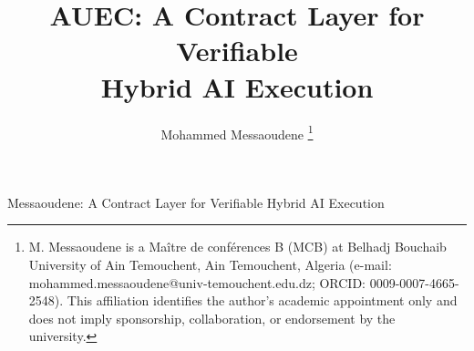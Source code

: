 \title{AUEC: A Contract Layer for Verifiable\\Hybrid AI Execution}

\author{Mohammed Messaoudene%
\thanks{M. Messaoudene is a Maître de conférences B (MCB) at Belhadj Bouchaib University of Ain Temouchent, Ain Temouchent, Algeria (e-mail: mohammed.messaoudene@univ-temouchent.edu.dz; ORCID: 0009-0007-4665-2548). This affiliation identifies the author's academic appointment only and does not imply sponsorship, collaboration, or endorsement by the university.}}

%
{Messaoudene: A Contract Layer for Verifiable Hybrid AI Execution}


\newcommand{\AUECAbstract}{%
AI agents increasingly bridge remote models and local resources. Protocols such as MCP and A2A standardize discovery and invocation, while the authority semantics of hybrid execution remain largely product-specific: what data may be read, where an operation may run, which effects and egress are allowed, which budgets apply, how a result should be interpreted, and what evidence remains after execution. This report presents the AI Universal Execution Contract (AUEC), a transport-independent layer for bounded delegation. A remote planner submits a declarative execution graph; a host-controlled user agent derives the effective contract by intersecting that proposal with local capability, placement, information-flow, egress, and budget policies. AUEC separates epistemic status, representation, and information classification. Its deterministic U0 profile admits pure operations and emits canonical, hash-linked receipts. Historical pinned official MCP results remain 39/39 applicable checks for revision 2025-11-25, 22/22 for the tested 2026-07-28 release-candidate profile, and 85/85 for the associated tested draft suite. Three isolated core-semantic mutations target the U0 host-operation intersection, U0 epistemic admission, and a pure executable authorization predicate. Each mutation enables the prohibited case and makes its safety test fail; restoration returns it to success. Finite models check 345 declared cases without a counterexample. Unmodified A2A testing remains incomplete (79/80 JSON-RPC and 76/78 HTTP+JSON). The evidence supports the tested U0 guards and pure decision predicate, not a production consequential-action profile, production security, or end-to-end utility.}

\newcommand{\AUECKeywords}{%
hybrid AI execution, protocol interoperability, host authority, capability security, epistemic non-escalation, information flow, provenance, tamper-evident receipts, MCP, A2A}
